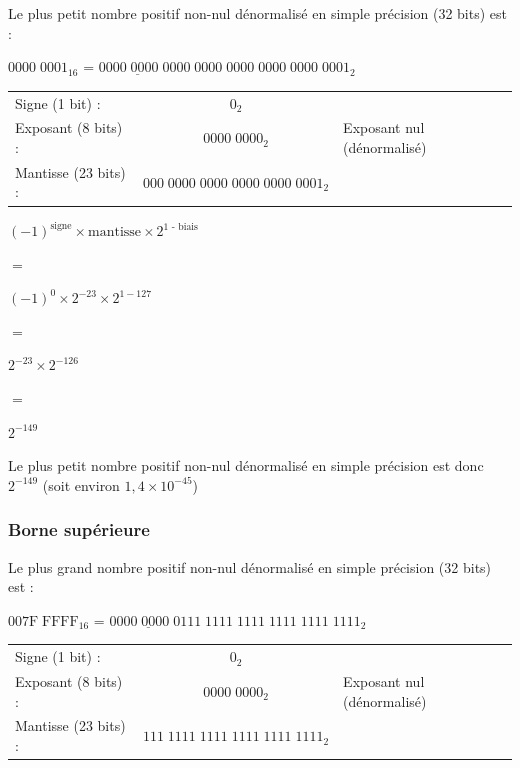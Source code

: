 \documentclass[11pt,a4paper]{article}
\begin{document}
Le plus petit nombre positif non-nul dénormalisé en simple précision (32 bits) est :

\medskip

$ 0000 \; 0001_{16} $ = $ 0\underline{000 \; 0000 \; 0}000 \; 0000 \; 0000 \; 0000 \; 0000 \; 0001_{2} $

\bigskip

\begin{tabular}{l c l}
Signe (1 bit) :      & $ 0_{2} $            & \\
Exposant (8 bits) :  & $ 0000 \; 0000_{2} $ & Exposant nul (dénormalisé)\\
Mantisse (23 bits) : & $ 000 \; 0000 \; 0000 \; 0000 \; 0000 \; 0001_{2} $ & \\
\end{tabular}

\bigskip

\begin{center}
$ (-1)^{\text{signe}} \times \text{mantisse} \times 2^{\text{1 - biais}} $

\smallskip
$ = $
\smallskip

$ (-1)^{\text{0}} \times 2^{-23} \times 2^{1 - 127} $

\smallskip
$ = $
\smallskip

$ 2^{-23} \times 2^{-126} $

\smallskip
$ = $
\smallskip

$ 2^{-149} $
\end{center}

Le plus petit nombre positif non-nul dénormalisé en simple précision est donc $ 2^{-149} $ (soit environ $ 1,4 \times 10^{-45} $)


\bigskip


\subsubsection{Borne supérieure}

Le plus grand nombre positif non-nul dénormalisé en simple précision (32 bits) est :

\medskip

$ 007\text{F} \; \text{FFFF}_{16} $ = $ 0\underline{000 \; 0000 \; 0}111 \; 1111 \; 1111 \; 1111 \; 1111 \; 1111_{2} $

\bigskip

\begin{tabular}{l c l}
Signe (1 bit) :      & $ 0_{2} $            & \\
Exposant (8 bits) :  & $ 0000 \; 0000_{2} $ & Exposant nul (dénormalisé)\\
Mantisse (23 bits) : & $ 111 \; 1111 \; 1111 \; 1111 \; 1111 \; 1111_{2} $ & \\
\end{tabular}
\end{document}
